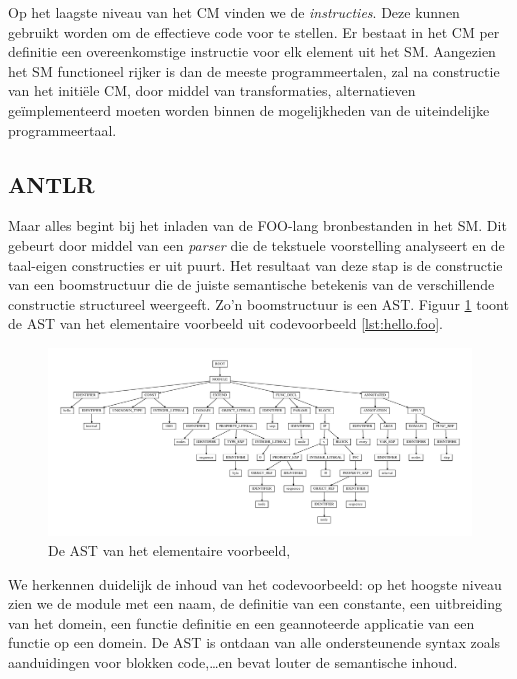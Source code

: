 Op het laagste niveau van het CM vinden we de \emph{instructies}. Deze kunnen
gebruikt worden om de effectieve code voor te stellen. Er bestaat in het CM per
definitie een overeenkomstige instructie voor elk element uit het SM. Aangezien
het SM functioneel rijker is dan de meeste programmeertalen, zal na constructie
van het initi\"ele CM, door middel van transformaties, alternatieven
ge\"implementeerd moeten worden binnen de mogelijkheden van de uiteindelijke
programmeertaal.

\subsection{ANTLR}
\label{subsection:devel-antlr}

Maar alles begint bij het inladen van de FOO-lang bronbestanden in het SM. Dit
gebeurt door middel van een \emph{parser} die de tekstuele voorstelling
analyseert en de taal-eigen constructies er uit puurt. Het resultaat van deze
stap is de constructie van een boomstructuur die de juiste semantische
betekenis van de verschillende constructie structureel weergeeft. Zo'n
boomstructuur is een AST. Figuur \ref{fig:devel-ast} toont de AST van het
elementaire voorbeeld uit codevoorbeeld \ref{lst:hello.foo}.

\begin{figure}[ht]
  \centering
  \includegraphics[width=\linewidth]{resources/hello_ast.pdf}
  \caption{De AST van het elementaire voorbeeld, }
  \label{fig:devel-ast}
\end{figure}

We herkennen duidelijk de inhoud van het codevoorbeeld: op het hoogste niveau
zien we de module met een naam, de definitie van een constante, een uitbreiding
van het domein, een functie definitie en een geannoteerde applicatie van een
functie op een domein. De AST is ontdaan van alle ondersteunende syntax zoals
aanduidingen voor blokken code,\dots en bevat louter de semantische inhoud.
